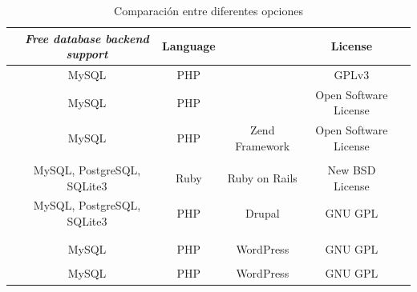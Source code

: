 \begin{table}[H]
    \tiny
   
\begin{tabular}{ |l|c|c|c|c|c| }

\hline
	&
	\textit{Free database backend support}&
	Language&
	\textit{\gloss{waf}}&
	License&

\\ \hline
	\nameOpenCart &
	MySQL&
	PHP&
	&
	GPLv3&
	
\\ \hline
	\namePrestaShop &
	MySQL&
	PHP&
	&
	Open Software License&
	
\\ \hline
	\nameMagento &
	MySQL&
	PHP&
	Zend Framework\cite{online_zend_framework}&
	Open Software License&
	
\\ \hline
	\nameZenCart &
	&
	&
	&
	&
 
\\ \hline
	\nameSpreeCommerce &
	MySQL, PostgreSQL, SQLite3&
	Ruby\cite{online_ruby_language}&
	Ruby on Rails\cite{online_ruby_rails}&
	New BSD License&

\\ \hline
	\nameDrupalCommerce &
	MySQL, PostgreSQL, SQLite3&
	PHP&
	Drupal\cite{online_drupal}&
	GNU GPL&
	
\\ \hline
	\nameOsCommerce &
	&
	&
	&
	&

\\ \hline
	\nameSimpleCart &
	&
	&
	&
	&
	
\\ \hline
	\nameWooCommerce &
	MySQL&
	PHP&
	WordPress\cite{online_wordpress}&
	GNU GPL&
	
\\ \hline
	\nameWPECommerce &
	&
	&
	&
	&
	
\\ \hline
	\nameJigoshop &
	MySQL&
	PHP&
	WordPress\cite{online_wordpress}&
	GNU GPL&
	
\\ \hline
\end{tabular}
    \caption{ Comparación entre diferentes opciones \ecommerce}
    \label{tab:wide_table}
\end{table}

